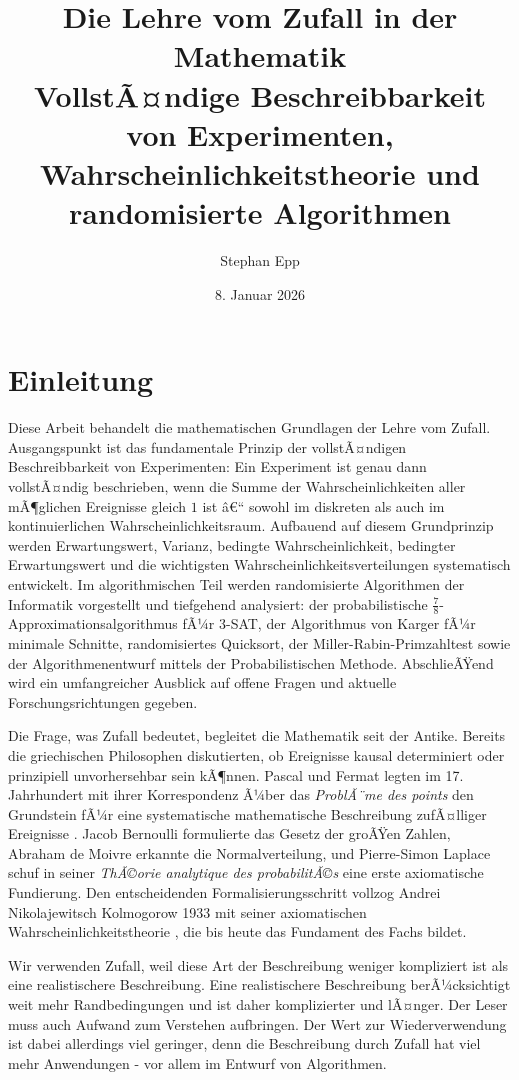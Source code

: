 ﻿\documentclass[12pt,a4paper]{article}
\title{\textbf{Die Lehre vom Zufall in der Mathematik} \\[-0.1em]
\large VollstÃ¤ndige Beschreibbarkeit von Experimenten,\\
	Wahrscheinlichkeitstheorie und randomisierte Algorithmen}
\author{Stephan Epp}
\date{8. Januar 2026}
\theoremstyle{definition}
\theoremstyle{plain}
\theoremstyle{remark}
\begin{document}
\maketitle
\tableofcontents
\newpage

\section{Einleitung}
Diese Arbeit behandelt die mathematischen Grundlagen der Lehre vom Zufall.
Ausgangspunkt ist das fundamentale Prinzip der vollstÃ¤ndigen Beschreibbarkeit
von Experimenten: Ein Experiment ist genau dann vollstÃ¤ndig beschrieben, wenn
die Summe der Wahrscheinlichkeiten aller mÃ¶glichen Ereignisse gleich $1$ ist â€“
sowohl im diskreten als auch im kontinuierlichen Wahrscheinlichkeitsraum.
Aufbauend auf diesem Grundprinzip werden Erwartungswert, Varianz,
bedingte Wahrscheinlichkeit, bedingter Erwartungswert und die wichtigsten
Wahrscheinlichkeitsverteilungen systematisch entwickelt. Im algorithmischen
Teil werden randomisierte Algorithmen der Informatik vorgestellt und tiefgehend
analysiert: der probabilistische $\frac{7}{8}$-Approximationsalgorithmus fÃ¼r
3-SAT, der Algorithmus von Karger fÃ¼r minimale Schnitte, randomisiertes
Quicksort, der Miller-Rabin-Primzahltest sowie der Algorithmenentwurf mittels
der Probabilistischen Methode. AbschlieÃŸend wird ein umfangreicher Ausblick
auf offene Fragen und aktuelle Forschungsrichtungen gegeben.

Die Frage, was Zufall bedeutet, begleitet die Mathematik seit der Antike.
Bereits die griechischen Philosophen diskutierten, ob Ereignisse kausal
determiniert oder prinzipiell unvorhersehbar sein kÃ¶nnen. Pascal und Fermat
legten im 17. Jahrhundert mit ihrer Korrespondenz Ã¼ber das \emph{Prob\-lÃ¨me
des points} den Grundstein fÃ¼r eine systematische mathematische Beschreibung
zufÃ¤lliger Ereignisse \cite{david1962games}. Jacob Bernoulli formulierte das
Gesetz der groÃŸen Zahlen, Abraham de Moivre erkannte die Normalverteilung,
und Pierre-Simon Laplace schuf in seiner \emph{ThÃ©orie analytique des
probabilitÃ©s} \cite{laplace1812theorie} eine erste axiomatische Fundierung.
Den entscheidenden Formalisierungsschritt vollzog Andrei Nikolajewitsch
Kolmogorow 1933 mit seiner axiomatischen Wahrscheinlichkeitstheorie
\cite{kolmogorov1933grundbegriffe}, die bis heute das Fundament des
Fachs bildet.

Wir verwenden Zufall, weil diese Art der Beschreibung weniger kompliziert ist als eine realistischere Beschreibung. Eine realistischere Beschreibung berÃ¼cksichtigt weit mehr Randbedingungen und ist daher komplizierter und lÃ¤nger. Der Leser muss auch Aufwand zum Verstehen aufbringen. Der Wert zur Wiederverwendung ist dabei allerdings viel geringer, denn die Beschreibung durch Zufall hat viel mehr Anwendungen - vor allem im Entwurf von Algorithmen.
\end{document}
